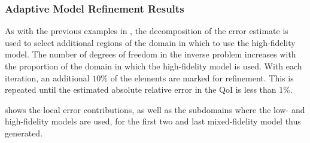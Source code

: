 \documentclass[review,sort&compress]{elsarticle}
\begin{document}
\subsubsection{Adaptive Model Refinement Results}

As with the previous examples in , the decomposition of the error estimate is used to select additional regions of the domain in which to use the high-fidelity model. The number of degrees of freedom in the inverse problem increases with the proportion of the domain in which the high-fidelity model is used. With each iteration, an additional $10\%$ of the elements are marked for refinement. This is repeated until the estimated absolute relative error in the QoI is less than $1\%$.

 shows the local error contributions, as well as the subdomains where the low- and high-fidelity models are used, for the first two and last mixed-fidelity model thus generated. 
%
\end{document}
